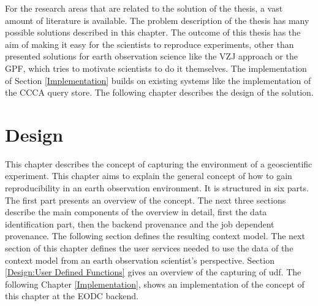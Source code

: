 \documentclass[draft,final]{vutinfth} %
\begin{document}
For the research areas that are related to the solution of the thesis, a vast amount of literature is available. The problem description of the thesis has many possible solutions described in this chapter. The outcome of this thesis has the aim of making it easy for the scientists to reproduce experiments, other than presented solutions for earth observation science like the VZJ approach or the GPF, which tries to motivate scientists to do it themselves. The implementation of Section \ref{Implementation} builds on existing systems like the implementation of the CCCA query store. The following chapter describes the design of the solution. 

 
\chapter{Design}\label{Design}


This chapter describes the concept of capturing the environment of a geoscientific experiment. This chapter aims to explain the general concept of how to gain reproducibility in an earth observation environment. It is structured in six parts. The first part presents an overview of the concept. The next three sections describe the main components of the overview in detail, first the data identification part, then the backend provenance and the job dependent provenance. The following section defines the resulting context model. The next section of this chapter defines the user services needed to use the data of the context model from an earth observation scientist's perspective. Section \ref{Design:User Defined Functions} gives an overview of the capturing of \gls{udf}. The following Chapter \ref{Implementation}, shows an implementation of the concept of this chapter at the EODC backend. 
\end{document}
